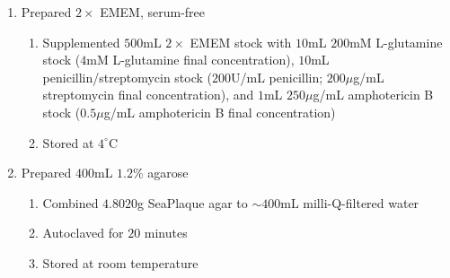 \begin{enumerate}
	\item Prepared $2\times$ EMEM, serum-free
		\begin{enumerate}
			\item Supplemented $500$mL $2\times$ EMEM stock with $10$mL $200$mM L-glutamine stock ($4$mM L-glutamine final concentration), $10$mL penicillin/streptomycin stock ($200$U/mL penicillin; $200\mu$g/mL streptomycin final concentration), and $1$mL $250\mu$g/mL amphotericin B stock ($0.5\mu$g/mL amphotericin B final concentration)
			\item Stored at $4^{\circ}$C
		\end{enumerate}
	\item Prepared $400$mL $1.2$\% agarose
		\begin{enumerate}
			\item Combined $4.8020$g SeaPlaque agar to $\sim 400$mL milli-Q-filtered water
			\item Autoclaved for $20$ minutes
			\item Stored at room temperature
		\end{enumerate}
\end{enumerate}